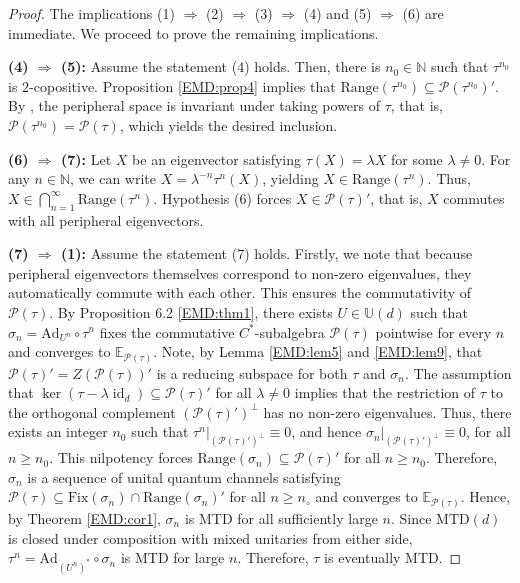 \documentclass[11pt,reqno]{amsart}
\theoremstyle{definition}
\theoremstyle{plain}
\theoremstyle{remark}
\numberwithin{equation}{section}%
\begin{document}
\begin{proof}
	  The implications (1) $\Rightarrow$ (2) $\Rightarrow$ (3) $\Rightarrow$ (4) and (5) $\Rightarrow$ (6) are immediate. We proceed to prove the remaining implications.
	  
	  
	   \noindent \textbf{(4) $\Rightarrow$ (5):} Assume the statement (4) holds. Then, there is $n_0\in\mathbb{N}$ such that $\tau^{n_0}$ is $2$-copositive. Proposition \ref{EMD:prop4} implies that $\text{Range}(\tau^{n_0}) \subseteq \mathcal{P}(\tau^{n_0})'$. By \cite[Theorem 3.1]{BKT}, the peripheral space is invariant under taking powers of $\tau$, that is, $\mathcal{P}(\tau^{n_0}) = \mathcal{P}(\tau)$, which yields the desired inclusion.
	   
	   
	     \noindent \textbf{(6) $\Rightarrow$ (7):} Let $X$ be an eigenvector satisfying $\tau(X) = \lambda X$ for some $\lambda \neq 0$. For any $n \in \mathbb{N}$, we can write $X = \lambda^{-n}\tau^n(X)$, yielding $X \in \text{Range}(\tau^n)$. Thus, $X \in \bigcap_{n=1}^\infty \text{Range}(\tau^n)$. Hypothesis (6) forces $X \in \mathcal{P}(\tau)'$, that is, $X$ commutes with all peripheral eigenvectors. 
	     
	     \noindent \textbf{(7) $\Rightarrow$ (1):} Assume the statement (7) holds. Firstly, we note that because peripheral eigenvectors themselves correspond to non-zero eigenvalues, they automatically commute with each other. This ensures the commutativity of $\mathcal{P}(\tau)$.  By Proposition 6.2 \ref{EMD:thm1}, there exists $U\in\mathbb{U}(d)$ such that $\sigma_n = \text{Ad}_{U^n} \circ \tau^n$ fixes the commutative $C^*$-subalgebra $\mathcal{P}(\tau)$ pointwise for every $n$ and converges to $\mathbb{E}_{\mathcal{P}(\tau)}$. Note, by Lemma \ref{EMD:lem5} and \ref{EMD:lem9}, that $\mathcal{P}(\tau)'=Z(\mathcal{P}(\tau))'$ is a reducing subspace for both $\tau$ and $\sigma_n$. The assumption that $\ker(\tau - \lambda\operatorname{id}_d) \subseteq \mathcal{P}(\tau)'$ for all $\lambda \neq 0$ implies that the restriction of $\tau$ to the orthogonal complement $(\mathcal{P}(\tau)')^{\perp}$ has no non-zero eigenvalues. Thus, there exists an integer $n_0$ such that $\tau^n|_{(\mathcal{P}(\tau)')^{\perp}} \equiv 0$, and hence $\sigma_n|_{(\mathcal{P}(\tau)')^{\perp}} \equiv 0$, for all $n \ge n_0$. This nilpotency forces $\text{Range}(\sigma_n) \subseteq \mathcal{P}(\tau)'$ for all $n \ge n_0$. Therefore, $\sigma_n$ is a sequence of unital quantum channels satisfying $\mathcal{P}(\tau) \subseteq \text{Fix}(\sigma_n) \cap \text{Range}(\sigma_n)'$ for all $n\geq n_\circ$ and converges to $\mathbb{E}_{\mathcal{P}(\tau)}$. Hence, by Theorem \ref{EMD:cor1}, $\sigma_n$ is MTD for all sufficiently large $n$. Since $\mathrm{MTD}(d)$ is closed under composition with mixed unitaries from either side, $\tau^n = \text{Ad}_{(U^n)^*} \circ \sigma_n$ is MTD for large $n$. Therefore, $\tau$ is eventually MTD.
\end{proof}
\end{document}
